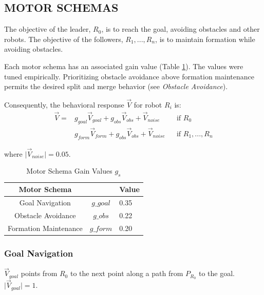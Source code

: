 \documentclass[letterpaper, 10 pt, conference]{ieeeconf}  %
\begin{document}
\subsection{MOTOR SCHEMAS}

The objective of the leader, $R_0$, is to reach the goal, avoiding obstacles and other robots. The objective of the followers, $R_1,...,R_n$, is to maintain formation while avoiding obstacles. 

Each motor schema has an associated gain value (Table \ref{motor_schema_gs}). The values were tuned empirically. Prioritizing obstacle avoidance above formation maintenance permits the desired split and merge behavior (see \textit{Obstacle Avoidance}).

Consequently, the behavioral response $\vec{V}$ for robot $R_i$ is:
\begin{equation*}
\begin{aligned}
\vec{V} = & g_{goal} \vec{V}_{goal} + g_{obs} \vec{V}_{obs} + \vec{V}_{noise}    && \text{if $R_0$} \\
              & g_{form} \vec{V}_{form} + g_{obs} \vec{V}_{obs} + \vec{V}_{noise}   && \text{if $R_1,...,R_n$}
\end{aligned}
\end{equation*}

where $\lvert\vec{V}_{noise}\rvert = 0.05$.

\begin{table}[h]
\begin{center}
\begin{tabular}{|c|cl|}
\hline
Motor Schema &  & Value \\
\hline
Goal Navigation & $g\_goal$                  & 0.35 \\
Obstacle Avoidance & $g\_obs$     & 0.22 \\
Formation Maintenance & $g\_form$       & 0.20 \\
\hline
\end{tabular}
\end{center}
\caption{Motor Schema Gain Values $g_s$}
\label{motor_schema_gs}
\end{table}

\subsubsection*{Goal Navigation}

$\vec{V}_{goal}$ points from $R_0$ to the next point along a path from $P_{R_0}$ to the goal. $\vert \vec{V}_{goal} \rvert = 1$.
\end{document}
